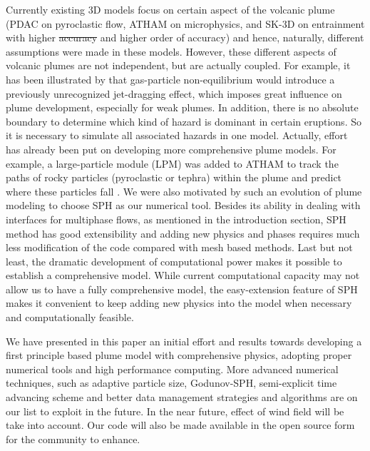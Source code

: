 \documentclass[gmd, manuscript]{copernicus} %
\providecommand{\DIFadd}[1]{{\protect\color{blue}\uwave{#1}}} %
\providecommand{\DIFdel}[1]{{\protect\color{red}\sout{#1}}}                      %
\providecommand{\DIFaddbegin}{} %
\providecommand{\DIFaddend}{} %
\providecommand{\DIFdelbegin}{} %
\providecommand{\DIFdelend}{} %
\begin{document}
Currently existing 3D models focus on certain aspect of the volcanic plume (PDAC on pyroclastic flow, ATHAM on microphysics, and SK-3D on entrainment with higher \DIFdelbegin \DIFdel{accuracy }\DIFdelend \DIFaddbegin \DIFadd{resolution }\DIFaddend and higher order of accuracy) and hence, naturally, different assumptions were made in these models. However, these different aspects of volcanic plumes are not independent, but are actually coupled. For example, it has been illustrated by \cite{cerminara2016large} that gas-particle non-equilibrium would introduce a previously unrecognized jet-dragging effect, which imposes great influence on plume development, especially for weak plumes. In addition, there is no absolute boundary to determine which kind of hazard is dominant in certain eruptions. So it is necessary to simulate all associated hazards in one model. Actually, effort has already been put on developing more comprehensive plume models. For example, a large-particle module (LPM) was added to ATHAM to track the paths of rocky particles (pyroclastic or tephra) within the plume and predict where these particles fall \citep{kobs2009modeling}. We were also motivated by such an evolution of plume modeling to choose SPH as our numerical tool. Besides its ability in dealing with interfaces for multiphase flows, as mentioned in the introduction section, SPH method has good extensibility and adding new physics and phases requires much less modification of the code compared with mesh based methods. Last but not least, the dramatic development of computational power makes it possible to establish a comprehensive model. While current computational capacity may not allow us to have a fully comprehensive model, the easy-extension feature of SPH makes it convenient to keep adding new physics into the model when necessary and computationally feasible. 

We have presented in this paper an initial effort and results towards developing a first principle based plume model with comprehensive physics, adopting proper numerical tools and high performance computing. More advanced numerical techniques, such as adaptive particle size, Godunov-SPH, semi-explicit time advancing scheme and better data management strategies and algorithms are on our list to exploit in the future. In the near future, effect of wind field will be take into account. Our code will also be made available in the open source form for the community to enhance.
\end{document}
